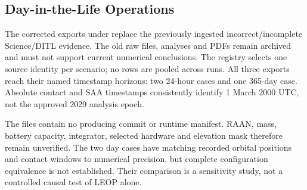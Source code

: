 \subsection{Day-in-the-Life Operations}\label{sec:sim-leop}
The corrected exports under  replace the previously ingested incorrect/incomplete Science/DITL evidence. The old raw files, analyses and PDFs remain archived and must not support current numerical conclusions. The registry selects one source identity per scenario; no rows are pooled across runs. All three exports reach their named timestamp horizons: two 24-hour cases and one 365-day case. Absolute contact and SAA timestamps consistently identify 1 March 2000 UTC, not the approved 2029 analysis epoch.

The files contain no producing commit or runtime manifest. RAAN, mass, battery capacity, integrator, selected hardware and elevation mask therefore remain unverified. The two day cases have matching recorded orbital positions and contact windows to numerical precision, but complete configuration equivalence is not established. Their comparison is a sensitivity study, not a controlled causal test of LEOP alone.

